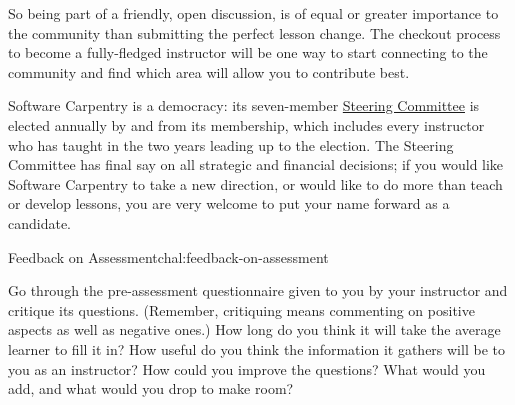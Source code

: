 So being part of a friendly, open discussion, is of equal or greater
importance to the community than submitting the perfect lesson change.
The checkout process to
become a fully-fledged instructor will be one way to start connecting to
the community and find which area will allow you to contribute best.


Software Carpentry is a democracy: its seven-member
\href{http://software-carpentry.org/scf/}{Steering Committee} is elected
annually by and from its membership, which includes every instructor who
has taught in the two years leading up to the election. The Steering
Committee has final say on all strategic and financial decisions; if you
would like Software Carpentry to take a new direction, or would like to
do more than teach or develop lessons, you are very welcome to put your
name forward as a candidate.

\begin{challenge}{Feedback on Assessment}{chal:feedback-on-assessment}

Go through the pre-assessment questionnaire given to you by your
instructor and critique its questions. (Remember, critiquing means
commenting on positive aspects as well as negative ones.) How long do
you think it will take the average learner to fill it in? How useful do
you think the information it gathers will be to you as an instructor?
How could you improve the questions? What would you add, and what would
you drop to make room?
\end{challenge}
